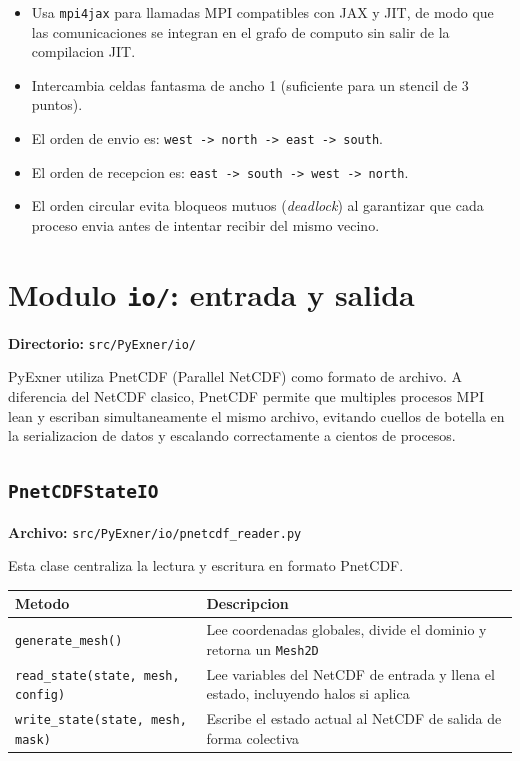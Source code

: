 \documentclass[11pt,a4paper]{article}
\newcommand{\code}[1]{\texttt{#1}}
\begin{document}
\begin{itemize}[leftmargin=1.6em]
  \item Usa \code{mpi4jax} para llamadas MPI compatibles con JAX y JIT, de modo que las
  comunicaciones se integran en el grafo de computo sin salir de la compilacion JIT.
  \item Intercambia celdas fantasma de ancho 1 (suficiente para un stencil de 3 puntos).
  \item El orden de envio es: \code{west -> north -> east -> south}.
  \item El orden de recepcion es: \code{east -> south -> west -> north}.
  \item El orden circular evita bloqueos mutuos (\emph{deadlock}) al garantizar que cada
  proceso envia antes de intentar recibir del mismo vecino.
\end{itemize}

\section{Modulo \code{io/}: entrada y salida}

\textbf{Directorio:} \code{src/PyExner/io/}

PyExner utiliza PnetCDF (Parallel NetCDF) como formato de archivo. A diferencia del NetCDF
clasico, PnetCDF permite que multiples procesos MPI lean y escriban simultaneamente el mismo
archivo, evitando cuellos de botella en la serializacion de datos y escalando correctamente a
cientos de procesos.

\subsection{\code{PnetCDFStateIO}}

\textbf{Archivo:} \code{src/PyExner/io/pnetcdf\_reader.py}

Esta clase centraliza la lectura y escritura en formato PnetCDF.

\begin{tabularx}{\textwidth}{L{4.5cm}Y}
\toprule
Metodo & Descripcion \\
\midrule
\code{generate\_mesh()} & Lee coordenadas globales, divide el dominio y retorna un \code{Mesh2D} \\
\code{read\_state(state, mesh, config)} & Lee variables del NetCDF de entrada y llena el estado, incluyendo halos si aplica \\
\code{write\_state(state, mesh, mask)} & Escribe el estado actual al NetCDF de salida de forma colectiva \\
\bottomrule
\end{tabularx}
\end{document}
